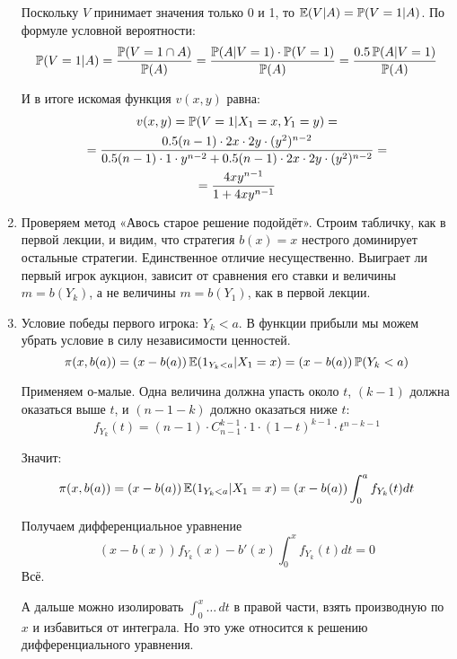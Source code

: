 \begin{enumerate}
Поскольку $ V $ принимает значения только 0 и 1, то $ \E(V|A)=\P(V=1|A) $. По формуле условной вероятности:
\begin{equation}
\P(V=1|A)=\frac{\P(V=1 \cap A)}{\P(A)}=\frac{\P(A|V=1)\cdot \P(V=1)}{\P(A)}=\frac{0.5\P(A|V=1)}{\P(A)}
\end{equation}

И в итоге искомая функция $ v(x,y) $ равна:
\begin{multline}
v(x,y)=\P(V=1|X_{1}=x,Y_{1}=y)=\\
=\frac{0.5(n-1)\cdot 2x \cdot 2y\cdot (y^{2})^{n-2}}{0.5(n-1)\cdot 1 \cdot y^{n-2}+0.5(n-1)\cdot 2x \cdot 2y \cdot (y^{2})^{n-2}}=\\
=\frac{4xy^{n-1}}{1+4xy^{n-1}}
\end{multline}

\item Проверяем метод «Авось старое решение подойдёт». Строим табличку, как в первой лекции, и видим, что стратегия $ b(x)=x $ нестрого доминирует остальные стратегии. Единственное отличие несущественно. Выиграет ли первый игрок аукцион, зависит от сравнения его ставки и величины $m=b(Y_{k}) $, а не величины $m=b(Y_{1}) $, как в первой лекции.


\item Условие победы первого игрока: $ Y_{k}<a $. В функции прибыли мы можем убрать условие в силу независимости ценностей.
\begin{equation}
\pi(x,b(a))=(x-b(a))\E(1_{Y_{k}<a}|X_{1}=x)=(x-b(a))\P(Y_{k}<a)
\end{equation}

Применяем о-малые. Одна величина должна упасть около $ t $, $ (k-1) $ должна оказаться выше $ t $, и $ (n-1-k) $ должно оказаться ниже $ t $:
\begin{equation}
f_{Y_{k}}(t)=(n-1)\cdot C_{n-1}^{k-1}\cdot 1\cdot (1-t)^{k-1}\cdot t^{n-k-1}
\end{equation}

Значит:
\begin{equation}
\pi(x,b(a))=(x-b(a))\E(1_{Y_{k}<a}|X_{1}=x)=(x-b(a))\int_{0}^{a}f_{Y_{k}}(t)dt
\end{equation}

Получаем дифференциальное уравнение
\begin{equation}
(x-b(x))f_{Y_{k}}(x)-b'(x)\int_{0}^{x}f_{Y_{k}}(t)dt=0
\end{equation}
Всё.

А дальше можно изолировать $ \int_{0}^{x}\ldots\, dt $ в правой части, взять производную по $ x $ и избавиться от интеграла. Но это уже относится к решению дифференциального уравнения.



\end{enumerate}
